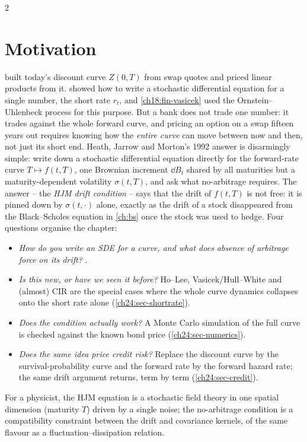 \begin{paracol}{2}
\section*{Motivation}
 built today's discount curve $Z(0,T)$ from swap quotes and priced linear products from it.  showed how to write a stochastic differential equation for a single number, the short rate $r_t$, and \cref{ch18:fin-vasicek} used the Ornstein--Uhlenbeck process for this purpose. But a bank does not trade one number: it trades against the whole forward curve, and pricing an option on a swap fifteen years out requires knowing how the \emph{entire curve} can move between now and then, not just its short end. Heath, Jarrow and Morton's 1992 answer is disarmingly simple: write down a stochastic differential equation directly for the forward-rate curve $T\mapsto f(t,T)$, one Brownian increment $\dd B_t$ shared by all maturities but a maturity-dependent volatility $\sigma(t,T)$, and ask what no-arbitrage requires. The answer -- the \emph{HJM drift condition} -- says that the drift of $f(t,T)$ is not free: it is pinned down by $\sigma(t,\cdot)$ alone, exactly as the drift of a stock disappeared from the Black--Scholes equation in \cref{ch:bs} once the stock was used to hedge. Four questions organise the chapter:
\begin{itemize}
  \item \emph{How do you write an SDE for a curve, and what does absence of arbitrage force on its drift?} .
  \item \emph{Is this new, or have we seen it before?} Ho--Lee, Vasicek/Hull--White and (almost) CIR are the special cases where the whole curve dynamics collapses onto the short rate alone (\cref{ch24:sec-shortrate}).
  \item \emph{Does the condition actually work?} A Monte Carlo simulation of the full curve is checked against the known bond price (\cref{ch24:sec-numerics}).
  \item \emph{Does the same idea price credit risk?} Replace the discount curve by the survival-probability curve and the forward rate by the forward hazard rate; the same drift argument returns, term by term (\cref{ch24:sec-credit}).
\end{itemize}
For a physicist, the HJM equation is a stochastic field theory in one spatial dimension (maturity $T$) driven by a single noise; the no-arbitrage condition is a compatibility constraint between the drift and covariance kernels, of the same flavour as a fluctuation--dissipation relation.


\end{paracol}
